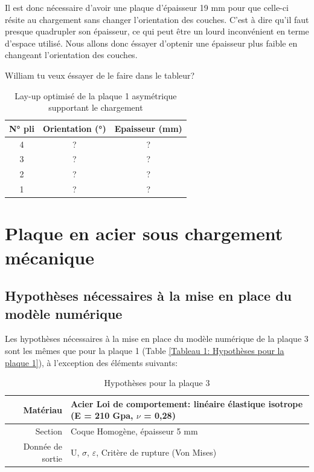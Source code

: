 \documentclass[a4paper,12pt]{article}
\begin{document}
Il est donc nécessaire d'avoir une plaque d'épaisseur 19 mm pour que celle-ci résite au chargement sans changer l'orientation des couches. C'est à dire qu'il faut presque quadrupler son épaisseur, ce qui peut être un lourd inconvénient en terme d'espace utilisé. Nous allons donc éssayer d'optenir une épaisseur plus faible en changeant l'orientation des couches. 

William tu veux éssayer de le faire dans le tableur?

\begin{table}[h!]
	\renewcommand{\arraystretch}{1.2} %
	\centering
	\begin{tabular}{c|c|c}
		\textbf{N° pli} & \textbf{Orientation (°)} & \textbf{Epaisseur (mm)} \\
		\hline
		4         & ?              & ?           \\
		3          & ?              & ?           \\
		2          & ?            & ?          \\
		1         & ?             & ?        \\
	\end{tabular}
	\caption{Lay-up optimisé de la plaque 1 asymétrique supportant le chargement}
	\label{tab:lay up opti epaisseur orientation}
\end{table}


\section{Plaque en acier sous chargement mécanique}
\subsection{Hypothèses nécessaires à la mise en place du modèle numérique}
Les hypothèses nécessaires à la mise en place du modèle numérique de la plaque 3 sont les mêmes que pour la plaque 1 (Table \ref{Tableau 1: Hypothèses pour la plaque 1}), à l'exception des éléments suivants:

\begin{table}[h!]
	\centering
	\renewcommand{\arraystretch}{1.2} %
	\begin{tabular}{r p{10cm}}
		Matériau   & Acier Loi de comportement: linéaire élastique isotrope (E = 210 Gpa, $\nu$ = 0,28)\\
		\hline

		Section   & Coque Homogène, épaisseur 5 mm\\
		\hline
		Donnée de sortie   & U, $\sigma$, $\varepsilon$, Critère de rupture (Von Mises) \\
	\end{tabular}
	\caption{Hypothèses pour la plaque 3}
	\label{Tableau 1: Hypothèses pour la plaque 3}
\end{table}
\end{document}
